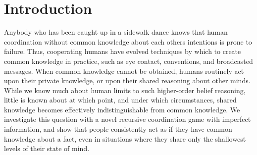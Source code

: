 \documentclass[twocolumn,a4paper,superscriptaddress,nofootinbib]{revtex4}
\newcommand{\tobo}[1]{{\color{red} TOBO: #1}}
\newcommand{\tsn}[1]{{\color{blue} TSN: #1}}
\newcommand{\re}[1]{{\color{brown} RE: #1}}
\begin{document}
\begin{abstract}
%
\end{abstract}


\section{Introduction}
Anybody who has been caught up in a sidewalk dance knows that human coordination without common knowledge about each others intentions is prone to failure. Thus, cooperating humans have evolved techniques by which to create common knowledge in practice, such as eye contact, conventions, and broadcasted messages. When common knowledge cannot be obtained, humans routinely act upon their private knowledge, or upon their shared reasoning about other minds. While we know much about human limits to such higher-order belief reasoning, little is known about at which point, and under which circumstances, shared knowledge becomes effectively indistinguishable from common knowledge. We investigate this question with a novel recursive coordination game with imperfect information, and show that people consistently act as if they have common knowledge about a fact, even in situations where they share only the shallowest levels of their state of mind. 
\end{document}
